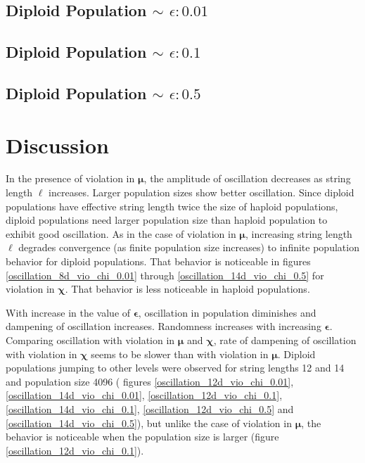 \subsection{Diploid Population $\mathtt{\sim}$ $\epsilon: 0.01$}

\subsection{Diploid Population $\mathtt{\sim}$ $\epsilon: 0.1$}

\subsection{Diploid Population $\mathtt{\sim}$ $\epsilon: 0.5$}


\section{Discussion}
In the presence of violation in $\bm{\mu}$, the amplitude of oscillation decreases 
as string length $\ell$ increases. 
Larger population sizes show better oscillation. 
Since diploid populations have effective string length twice the size of haploid populations, 
diploid populations need larger population size than haploid population to exhibit good oscillation. 
As in the case of violation in $\bm{\mu}$, increasing string length $\ell$ 
degrades convergence (as finite population size increases) to infinite population behavior for diploid populations. 
That behavior is noticeable in figures 
\ref{oscillation_8d_vio_chi_0.01} through \ref{oscillation_14d_vio_chi_0.5} for violation in $\bm{\chi}$. 
That behavior is less noticeable in haploid populations.

With increase in the value of $\bm{\epsilon}$, 
oscillation in population diminishes and dampening of oscillation increases. 
Randomness increases with increasing $\bm{\epsilon}$.
Comparing oscillation with violation in $\bm{\mu}$ and $\bm{\chi}$, rate of dampening of oscillation with violation 
in $\bm{\chi}$ seems to be slower than with violation in ${\bm{\mu}}$. 
Diploid populations jumping to other levels 
were observed for string lengths 12 and 14 and population size 4096  ( 
figures \ref{oscillation_12d_vio_chi_0.01}, \ref{oscillation_14d_vio_chi_0.01}, \ref{oscillation_12d_vio_chi_0.1}, 
\ref{oscillation_14d_vio_chi_0.1}, \ref{oscillation_12d_vio_chi_0.5} and \ref{oscillation_14d_vio_chi_0.5}), 
but unlike the case of violation in $\bm{\mu}$, 
the behavior is noticeable when the population size is larger (figure \ref{oscillation_12d_vio_chi_0.1}). 

